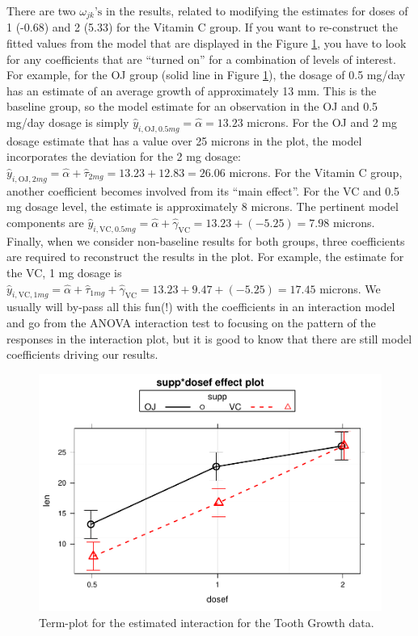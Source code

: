\documentclass[]{book}
\theoremstyle{definition}
\theoremstyle{definition}
\theoremstyle{remark}
\begin{document}
There are two \(\omega_{jk}\text{'s}\) in the results, related to
modifying the estimates for doses of 1 (-0.68) and 2 (5.33) for the
Vitamin C group. If you want to re-construct the fitted values from the
model that are displayed in the Figure \ref{fig:Figure4-10}, you have to
look for any coefficients that are ``turned on'' for a combination of
levels of interest. For example, for the OJ group (solid line in Figure
\ref{fig:Figure4-10}), the dosage of 0.5 mg/day has an estimate of an
average growth of approximately 13 mm. This is the baseline group, so
the model estimate for an observation in the OJ and 0.5 mg/day dosage is
simply \(\hat{y}_{i,\text{OJ},0.5mg}=\hat{\alpha}=13.23\) microns. For
the OJ and 2 mg dosage estimate that has a value over 25 microns in the
plot, the model incorporates the deviation for the 2 mg dosage:
\(\hat{y}_{i,\text{OJ},2mg}=\hat{\alpha} + \hat{\tau}_{2mg}=13.23 + 12.83 = 26.06\)
microns. For the Vitamin C group, another coefficient becomes involved
from its ``main effect''. For the VC and 0.5 mg dosage level, the
estimate is approximately 8 microns. The pertinent model components are
\(\hat{y}_{i,\text{VC},0.5mg}=\hat{\alpha} + \hat{\gamma}_{\text{VC}}=13.23 + (-5.25) = 7.98\)
microns. Finally, when we consider non-baseline results for both groups,
three coefficients are required to reconstruct the results in the plot.
For example, the estimate for the VC, 1 mg dosage is
\(\hat{y}_{i,\text{VC},1mg}=\hat{\alpha} + \hat{\tau}_{1mg} + \hat{\gamma}_{\text{VC}} =13.23 + 9.47 + (-5.25) = 17.45\)
microns. We usually will by-pass all this fun(!) with the coefficients
in an interaction model and go from the ANOVA interaction test to
focusing on the pattern of the responses in the interaction plot, but it
is good to know that there are still model coefficients driving our
results.




\begin{figure}
\centering
\includegraphics{04-twoWayAnova_files/figure-latex/Figure4-10-1.pdf}
\caption{\label{fig:Figure4-10}Term-plot for the estimated interaction for the Tooth
Growth data.}
\end{figure}
\end{document}
